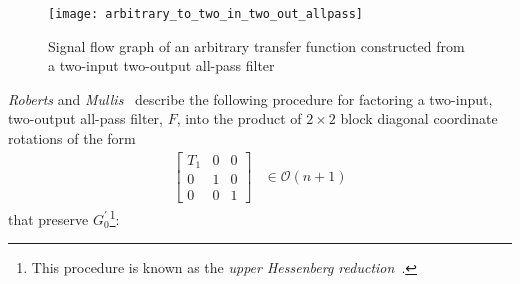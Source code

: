 \documentclass[a4paper,twoside,10pt,english]{report}
\begin{document}
\begin{figure}[tbh]
\centering
\texttt{[image: arbitrary\_to\_two\_in\_two\_out\_allpass]}
\caption{Signal flow graph of an arbitrary transfer function constructed from
a two-input two-output all-pass filter}
\label{fig:Arbitrary-transfer-function-from-two-input-two-output-allpass}
\end{figure}

\emph{Roberts} and
\emph{Mullis}~\cite[pp. 460-461]{RobertsMullis_DigitalSignalProcessing}
describe the following procedure for factoring a two-input, two-output
all-pass filter, $F$, into the product of $2\times2$ block diagonal coordinate
rotations of the form
\begin{align*}
\left[\begin{array}{ccc}
T_{1} & 0 & 0\\
   0 & 1 & 0 \\
   0 & 0 & 1
\end{array}\right] & \in{}\mathcal{O}\left(n+1\right)
\end{align*}
that preserve $G_{0}^{\prime}$\footnote{This procedure is known as the \emph{upper
Hessenberg reduction}~\cite[Section 7.4.2]{GolubVanLoan_MatrixComputations}.}:
\end{document}
